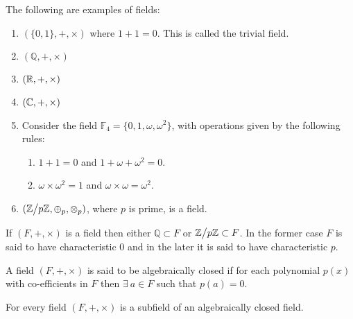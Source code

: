 \begin{example}
  The following are examples of fields:
  \begin{enumerate}
    \item $(\{0,1\}, +, \times)$ where $1+1= 0$. This is called the trivial field.
    \item $(\mathbb{Q} , +, \times)$
    \item $(\mathbb{R}, +, \times)$
    \item $(\mathbb{C}, +, \times)$
    \item Consider the field $ \mathbb{F}_4 = \{0,1,\omega, \omega^2\}$, with operations given by the following rules:
      \begin{enumerate}
        \item $1+1 = 0$ and $1+\omega+\omega^2 = 0$.
        \item $\omega\times \omega^2 = 1$ and $\omega\times\omega = \omega^2$.
      \end{enumerate}
    \item $(\Z\bign/p\Z, \oplus_p, \otimes_p)$, where $p$ is prime, is a field.
  \end{enumerate}
\end{example}
\begin{theorem}
  If $(F,+,\times)$ is a field then either $ \mathbb{Q} \subset F$ or $\Z\bign/p\Z \subset F$. In the former case $F$ is said to have characteristic $0$ and in the later it is said to have characteristic $p$.
\end{theorem}
\begin{definition}
  A field $(F, +, \times)$ is said to be algebraically closed if for each polynomial $p(x)$ with co-efficients in $F$ then $\exists\ a\in F$ such that $p(a) = 0$.  
\end{definition}
\begin{theorem}
  For every field $(F, +, \times)$ is a subfield of an algebraically closed field.
\end{theorem}
